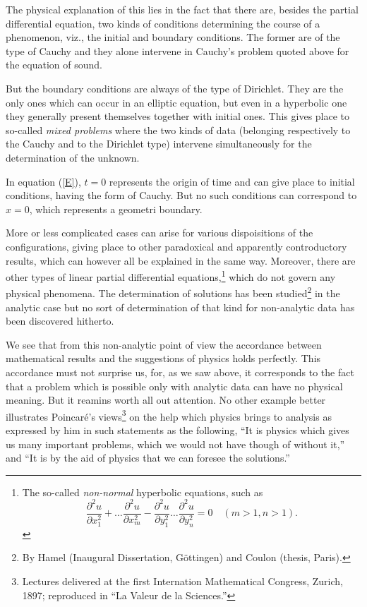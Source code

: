 \documentclass[12pt,oneside]{book}
\newcommand{\iit}[1]{\textit{#1}}
\begin{document}
The physical explanation of this lies in the fact that there are, besides the partial differential equation, two kinds of conditions determining the course of a phenomenon, viz., the initial and boundary conditions. The former are of the type of Cauchy and they alone intervene in Cauchy's problem quoted above for the equation of sound. \par 

But the boundary conditions are always of the type of Dirichlet. They are the only ones which can occur in an elliptic equation, but even in a hyperbolic one they generally present themselves together with initial ones. This gives place to so-called \iit{mixed problems} where the two kinds of data (belonging respectively to the Cauchy and to the Dirichlet type) intervene simultaneously for the determination of the unknown. \par 

In equation (\ref{E}), $t=0$ represents the origin of time and can give place to initial conditions, having the form of Cauchy. But no such conditions can correspond to $x=0$, which represents a geometri boundary. \par 

More or less complicated cases can arise for various dispoisitions of the configurations, giving place to other paradoxical and apparently controductory results, which can however all be explained in the same way. Moreover, there are other types of linear partial differential equations,\footnote{The so-called \iit{non-normal} hyperbolic equations, such as
\begin{equation*}
    \frac{\partial^2u}{\partial x_1^2}+\dots \frac{\partial^2u}{\partial x_m^2} - \frac{\partial^2u}{\partial y_1^2}\dots \frac{\partial^2u}{\partial y_n^2}=0 \quad (m>1,n>1).
\end{equation*} }
which do not govern any physical phenomena. The determination of solutions has been studied\footnote{By Hamel (Inaugural Dissertation, G\"ottingen) and Coulon (thesis, Paris).} in the analytic case but no sort of determination of that kind for non-analytic data has been discovered hitherto. \par 

We see that from this non-analytic point of view the accordance between mathematical results and the suggestions of physics holds perfectly. This accordance must not surprise us, for, as we saw above, it corresponds to the fact that a problem which is possible only with analytic data can have no physical meaning. But it reamins worth all out attention. No other example better illustrates Poincar\'e's views\footnote{Lectures delivered at the first Internation Mathematical Congress, Zurich, 1897; reproduced in ``La Valeur de la Sciences.''} on the help which physics brings to analysis as expressed by him in such statements as the following, ``It is physics which gives us many important problems, which we would not have though of without it,'' and ``It is by the aid of physics that we can foresee the solutions.'' \par 
\end{document}
